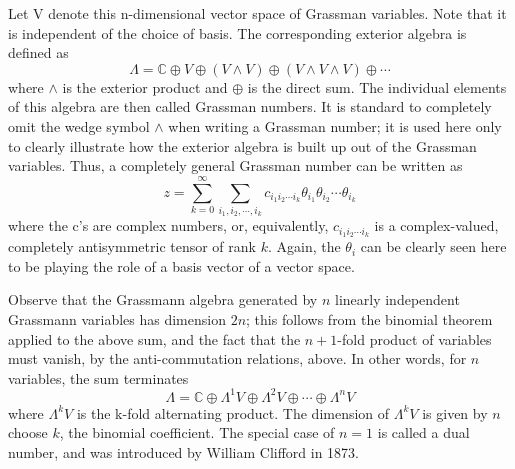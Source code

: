 Let V denote this n-dimensional vector space of Grassman variables. Note that it is independent of the choice of basis. The corresponding exterior algebra is defined as
\[\Lambda =\mathbb {C} \oplus V\oplus \left(V\wedge V\right)\oplus \left(V\wedge V\wedge V\right)\oplus \cdots\]
where $\wedge$ is the exterior product and $\oplus$ is the direct sum. The individual elements of this algebra are then called Grassman numbers. It is standard to completely omit the wedge symbol $\wedge$ when writing a Grassman number; it is used here only to clearly illustrate how the exterior algebra is built up out of the Grassman variables. Thus, a completely general Grassman number can be written as
\[z=\sum _{k=0}^{\infty }\sum _{i_{1},i_{2},\cdots ,i_{k}}c_{i_{1}i_{2}\cdots i_{k}}\theta _{i_{1}}\theta _{i_{2}}\cdots \theta _{i_{k}}\]
where the c's are complex numbers, or, equivalently, $c_{i_{1}i_{2}\cdots i_{k}}$ is a complex-valued, completely antisymmetric tensor of rank $k$. Again, the $\theta _{i}$ can be clearly seen here to be playing the role of a basis vector of a vector space.

Observe that the Grassmann algebra generated by $n$ linearly independent Grassmann variables has dimension $2n$; this follows from the binomial theorem applied to the above sum, and the fact that the $n+1$-fold product of variables must vanish, by the anti-commutation relations, above. In other words, for $n$ variables, the sum terminates
\[\Lambda =\mathbb {C} \oplus \Lambda ^{1}V\oplus \Lambda ^{2}V\oplus \cdots \oplus \Lambda ^{n}V\]
where $\Lambda ^{k}V$ is the k-fold alternating product. The dimension of  $\Lambda ^{k}V$ is given by $n$ choose $k$, the binomial coefficient. The special case of $n=1$ is called a dual number, and was introduced by William Clifford in 1873.


